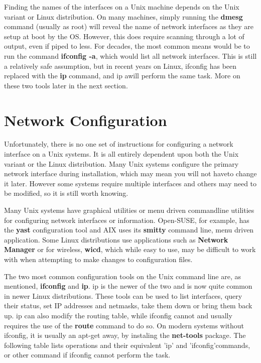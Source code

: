 Finding the names of the interfaces on a Unix machine depends on the Unix variant or Linux distribution. On many machines, simply running the \textbf{dmesg} command (usually as root) will reveal the name of network interfaces as they are setup at boot by the OS. However, this does require scanning through a lot of output, even if piped to less. For decades, the most common means would be to run the command \textbf{ifconfig -a}, which would list all network interfaces. This is still a relatively safe assumption, but in recent years on Linux, ifconfig has been replaced with the \textbf{ip} command, and ip awill perform the same task.  More on these two tools later in the next section.

\section{Network Configuration}

Unfortunately, there is no one set of instructions for configuring a network interface on a Unix systems. It is all entirely dependent upon both the Unix variant or the Linux distribution. Many Unix systems configure the primary network interface during installation, which may mean you will not haveto change it later. However some systems require multiple interfaces and others may need to be modified, so it is still worth knowing.

Many Unix systems have graphical utilities or menu driven commandline utilities for configuring network  interfaces or information. Open-SUSE, for example, has the \textbf{yast} configuration tool and AIX uses its \textbf{smitty} command line, menu driven application.  Some Linux distributions use applications such as \textbf{Network Manager} or for wireless, \textbf{wicd}, which while easy to use, may be difficult to work with when attempting to make changes to configuration files. 

The two most common configuration tools on the Unix command line are, as mentioned, \textbf{ifconfig} and \textbf{ip}.  ip is the newer of the two and is now quite common in newer Linux distributions.  These tools can be used to list interfaces, query their status, set IP addresses and netmasks, take them down or bring them back up. ip can also modify the routing table, while ifconfig cannot and usually requires the use of the \textbf{route} command to do so. On modern systems without ifconfig, it is usually an apt-get away, by instaling the \textbf{net-tools} package. The following table lists operations and their equivalent ’ip’ and ’ifconfig’commands, or other command if ifconfig cannot perform the task.

